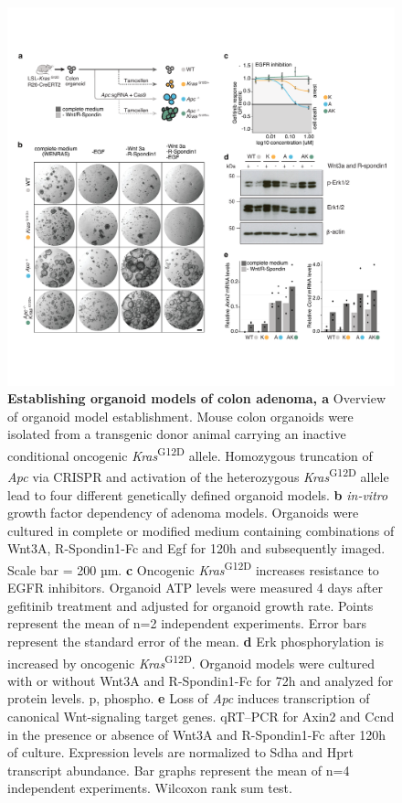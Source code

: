 \begin{flushleft}
\begin{figure}[H]
\centering
\includegraphics[width=\textwidth,
                keepaspectratio]{figures/adenomaprofiling/pdf/fig_1_0.pdf}
\caption[Establishing organoid models of colon adenoma]{\textbf{Establishing organoid models of colon adenoma, a} Overview of organoid model establishment. Mouse colon organoids were isolated from a transgenic donor animal carrying an inactive conditional oncogenic \textit{Kras}\textsuperscript{G12D} allele. Homozygous truncation of \textit{Apc} via CRISPR and activation of the heterozygous \textit{Kras}\textsuperscript{G12D} allele lead to four different genetically defined organoid models.
\textbf{b} \textit{in-vitro} growth factor dependency of adenoma models. Organoids were cultured in complete or modified medium containing combinations of Wnt3A, R-Spondin1-Fc and Egf for 120h and subsequently imaged. Scale bar = 200 µm.
\textbf{c}	Oncogenic \textit{Kras}\textsuperscript{G12D} increases resistance to EGFR inhibitors. Organoid ATP levels were measured 4 days after gefitinib treatment and adjusted for organoid growth rate. Points represent the mean of n=2 independent experiments. Error bars represent the standard error of the mean.
\textbf{d} Erk phosphorylation is increased by oncogenic \textit{Kras}\textsuperscript{G12D}. Organoid models were cultured with or without Wnt3A and R-Spondin1-Fc for 72h and analyzed for protein levels. p, phospho.   
\textbf{e}	Loss of \textit{Apc} induces transcription of canonical Wnt-signaling target genes. qRT–PCR for Axin2 and Ccnd in the presence or absence of Wnt3A and R-Spondin1-Fc after 120h of culture. Expression levels are normalized to Sdha and Hprt transcript abundance. Bar graphs represent the mean of n=4 independent experiments. Wilcoxon rank sum test.
}
\label{fig_a10}
\end{figure}


\end{flushleft}
